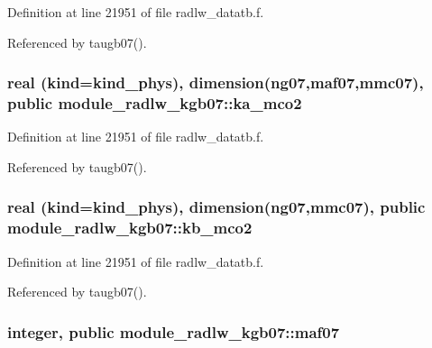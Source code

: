Definition at line 21951 of file radlw\+\_\+datatb.\+f.



Referenced by taugb07().

\subsubsection[{\texorpdfstring{ka\+\_\+mco2}{ka_mco2}}]{\setlength{\rightskip}{0pt plus 5cm}real (kind=kind\+\_\+phys), dimension(ng07,{\bf maf07},{\bf mmc07}), public module\+\_\+radlw\+\_\+kgb07\+::ka\+\_\+mco2}\hypertarget{namespacemodule__radlw__kgb07_a3fdad494f3d3fcf9306da6a81d97bd43}{}\label{namespacemodule__radlw__kgb07_a3fdad494f3d3fcf9306da6a81d97bd43}


Definition at line 21951 of file radlw\+\_\+datatb.\+f.



Referenced by taugb07().

\subsubsection[{\texorpdfstring{kb\+\_\+mco2}{kb_mco2}}]{\setlength{\rightskip}{0pt plus 5cm}real (kind=kind\+\_\+phys), dimension(ng07,{\bf mmc07}), public module\+\_\+radlw\+\_\+kgb07\+::kb\+\_\+mco2}\hypertarget{namespacemodule__radlw__kgb07_a2dcfbe76332d559cda48c7ba065ab349}{}\label{namespacemodule__radlw__kgb07_a2dcfbe76332d559cda48c7ba065ab349}


Definition at line 21951 of file radlw\+\_\+datatb.\+f.



Referenced by taugb07().

\subsubsection[{\texorpdfstring{maf07}{maf07}}]{\setlength{\rightskip}{0pt plus 5cm}integer, public module\+\_\+radlw\+\_\+kgb07\+::maf07}\hypertarget{namespacemodule__radlw__kgb07_a21ac454fe21fb07ee555b4106121b2ae}{}\label{namespacemodule__radlw__kgb07_a21ac454fe21fb07ee555b4106121b2ae}


